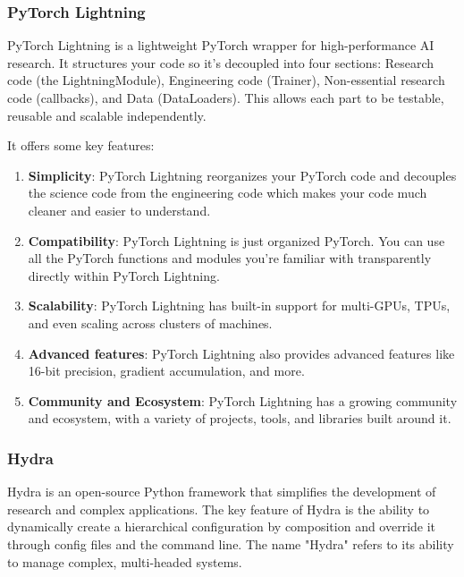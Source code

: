\subsubsection{PyTorch Lightning}
PyTorch Lightning is a lightweight PyTorch wrapper for high-performance AI research. It structures your code so it's decoupled into four sections: Research code (the LightningModule), Engineering code (Trainer), Non-essential research code (callbacks), and Data (DataLoaders). This allows each part to be testable, reusable and scalable independently.

It offers some key features:
\begin{enumerate}
    \item \textbf{Simplicity}: PyTorch Lightning reorganizes your PyTorch code and decouples the science code from the engineering code which makes your code much cleaner and easier to understand.
    \item \textbf{Compatibility}: PyTorch Lightning is just organized PyTorch. You can use all the PyTorch functions and modules you're familiar with transparently directly within PyTorch Lightning.
    \item \textbf{Scalability}: PyTorch Lightning has built-in support for multi-GPUs, TPUs, and even scaling across clusters of machines.
    \item \textbf{Advanced features}: PyTorch Lightning also provides advanced features like 16-bit precision, gradient accumulation, and more.
    \item \textbf{Community and Ecosystem}: PyTorch Lightning has a growing community and ecosystem, with a variety of projects, tools, and libraries built around it.
\end{enumerate}

\subsubsection{Hydra}
Hydra is an open-source Python framework that simplifies the development of research and complex applications. The key feature of Hydra is the ability to dynamically create a hierarchical configuration by composition and override it through config files and the command line. The name "Hydra" refers to its ability to manage complex, multi-headed systems.

